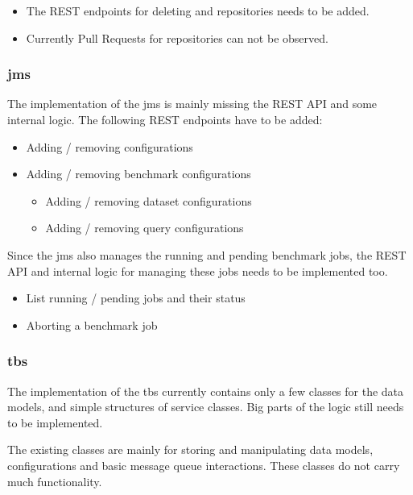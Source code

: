 \begin{itemize}
	\item The REST endpoints for deleting \gh{} and \dockh{} repositories needs to be added.
	
	\item Currently Pull Requests for \gh{} repositories can not be observed.
\end{itemize}


\subsubsection{\acl{jms}}
The implementation of the \acl{jms} is mainly missing the REST API and some internal logic.
The following REST endpoints have to be added:

\begin{itemize}
	\item Adding / removing \ts{} configurations
	
	\item Adding / removing benchmark configurations
		\begin{itemize}
			\item Adding / removing dataset configurations
			
			\item Adding / removing query configurations
		\end{itemize}
\end{itemize}

Since the \ac{jms} also manages the running and pending benchmark jobs, the REST API and internal logic for managing these jobs needs to be implemented too.

\begin{itemize}
	\item List running / pending jobs and their status
	
	\item Aborting a benchmark job
\end{itemize}



\subsubsection{\acl{tbs}}
The implementation of the \acl{tbs} currently contains only a few classes for the data models, and simple structures of service classes.
Big parts of the logic still needs to be implemented.

The existing classes are mainly for storing and manipulating data models, configurations and basic message queue interactions.
These classes do not carry much functionality.

